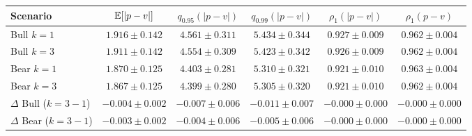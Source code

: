 \begin{tabular}{lccccc}
\hline
Scenario & $\mathbb{E}[|p-v|]$ & $q_{0.95}(|p-v|)$ & $q_{0.99}(|p-v|)$ & $\rho_1(|p-v|)$ & $\rho_1(p-v)$ \\
\hline
Bull $k=1$ & $1.916\pm0.142$ & $4.561\pm0.311$ & $5.434\pm0.344$ & $0.927\pm0.009$ & $0.962\pm0.004$ \\
Bull $k=3$ & $1.911\pm0.142$ & $4.554\pm0.309$ & $5.423\pm0.342$ & $0.926\pm0.009$ & $0.962\pm0.004$ \\
Bear $k=1$ & $1.870\pm0.125$ & $4.403\pm0.281$ & $5.310\pm0.321$ & $0.921\pm0.010$ & $0.963\pm0.004$ \\
Bear $k=3$ & $1.867\pm0.125$ & $4.399\pm0.280$ & $5.305\pm0.320$ & $0.921\pm0.010$ & $0.962\pm0.004$ \\
$\Delta$ Bull ($k=3-1$) & $-0.004\pm0.002$ & $-0.007\pm0.006$ & $-0.011\pm0.007$ & $-0.000\pm0.000$ & $-0.000\pm0.000$ \\
$\Delta$ Bear ($k=3-1$) & $-0.003\pm0.002$ & $-0.004\pm0.006$ & $-0.005\pm0.006$ & $-0.000\pm0.000$ & $-0.000\pm0.000$ \\
\hline
\end{tabular}
